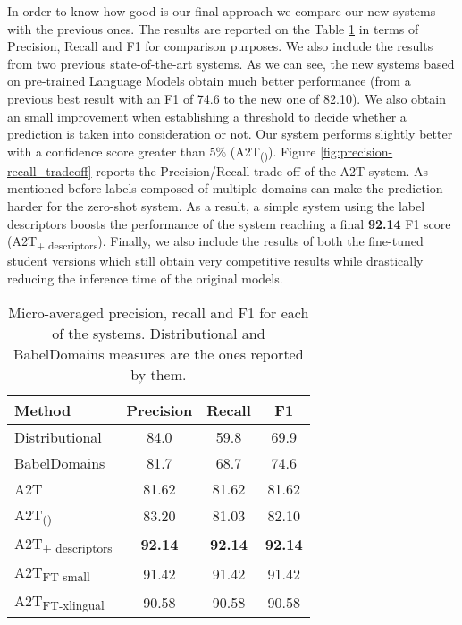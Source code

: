 \documentclass[11pt]{article}
\begin{document}
In order to know how good is our final approach we compare our new systems with the previous ones. The results are reported on the Table \ref{tab:sota} in terms of Precision, Recall and F1 for comparison purposes. We also include the results from two previous state-of-the-art systems. As we can see, the new systems based on pre-trained Language Models obtain much better performance (from a previous best result with an F1 of 74.6 to the new one of 82.10). We also obtain an small improvement when
establishing a threshold to decide whether a prediction is taken into consideration or not. Our system performs slightly better with a confidence score greater than 5\%  (A2T\textsubscript{()}). Figure \ref{fig:precision-recall_tradeoff} reports the Precision/Recall trade-off of the A2T system. As mentioned before labels composed of multiple domains can make the prediction harder for the zero-shot system. As a result, a simple system using the label descriptors boosts the performance of the system reaching a final \textbf{92.14} F1 score (A2T\textsubscript{+ descriptors}). Finally, we also include the results of both the  fine-tuned student versions which still obtain very competitive results while drastically reducing the inference time of the original models.

\begin{table}[!ht]
    \centering
    \begin{tabular}{l|ccc}
    \toprule
        Method & Precision & Recall & F1 \\
    \midrule
        Distributional & 84.0 & 59.8 & 69.9 \\
        BabelDomains & 81.7 & 68.7 & 74.6 \\
    \midrule
        A2T & 81.62 & 81.62 & 81.62 \\
        A2T\textsubscript{()} & 83.20 & 81.03 & 82.10 \\
        A2T\textsubscript{+ descriptors} & \textbf{92.14} & \textbf{92.14} & \textbf{92.14} \\
    \midrule
        A2T\textsubscript{FT-small} & 91.42 & 91.42 & 91.42 \\
        A2T\textsubscript{FT-xlingual} & 90.58 & 90.58 & 90.58 \\
    \bottomrule
    \end{tabular}
    \caption{Micro-averaged precision, recall and F1 for each of the systems. Distributional \cite{camacho2016} and BabelDomains \cite{camacho2017} measures are the ones reported by them.}
    \label{tab:sota}
\end{table}
\end{document}
